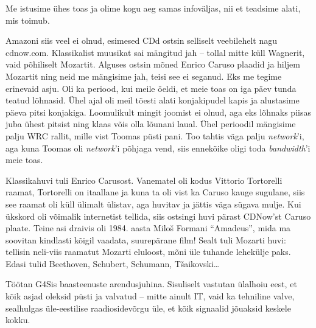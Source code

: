 
Me istusime ühes toas ja olime kogu aeg samas infoväljas, nii et teadsime alati, mis toimub.


Amazoni siis veel ei olnud, 
esimesed CDd ostsin selliselt veebilehelt nagu cdnow.com. 
Klassikalist muusikat sai mängitud jah -- tollal mitte küll 
Wagnerit, vaid põhiliselt Mozartit. 
Alguses ostsin mõned Enrico Caruso plaadid ja hiljem 
Mozartit ning neid me mängisime jah, teisi see ei seganud. Eks me tegime 
erinevaid asju. Oli ka periood, kui meile öeldi, et meie toas on iga päev tunda teatud lõhnasid. Ühel ajal oli meil tõesti alati 
konjakipudel kapis ja alustasime päeva pitsi konjakiga. Loomulikult 
mingit joomist ei olnud, aga eks lõhnaks piisas juba ühest pitsist ning klaas võis olla lõunani
laual. 
Ühel perioodil mängisime palju WRC rallit, mille vist Toomas püsti pani. Too tahtis väga palju \emph{network}'i, 
aga kuna Toomas oli \emph{network}'i põhjaga vend, siis ennekõike oligi toda 
\emph{bandwidth}'i meie toas.


Klassikahuvi tuli Enrico Carusost. Vanematel oli kodus 
Vittorio Tortorelli raamat, Tortorelli on itaallane ja kuna ta oli vist ka
Caruso kauge sugulane, siis see raamat 
oli küll ülimalt ülistav, aga huvitav ja jättis väga sügava mulje. 
Kui ükskord oli võimalik internetist tellida, siis ostsingi huvi pärast 
CDNow'st Caruso plaate. Teine asi draivis oli 1984. aasta 
Miloš Formani \enquote{Amadeus}, mida ma soovitan kindlasti kõigil vaadata, suurepärane 
film! Sealt tuli Mozarti huvi: tellisin neli-viis
raamatut Mozarti eluloost, mõni üle tuhande 
lehekülje paks. Edasi tulid Beethoven, Schubert, 
Schumann, Tšaikovski\ldots


Töötan G4Sis baasteenuste arendusjuhina. 
Sisuliselt vastutan ülalhoiu eest, et kõik asjad oleksid püsti ja valvatud -- mitte ainult IT, vaid ka tehniline valve, sealhulgas 
üle-eestilise raadiosidevõrgu üle, et kõik signaalid jõuaksid keskele kokku.
